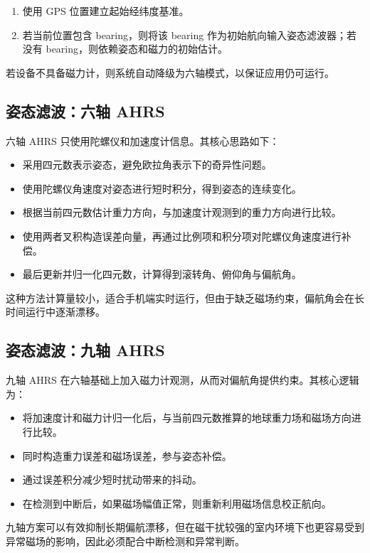\documentclass[12pt,a4paper]{ctexart}
\begin{document}
\begin{enumerate}
    \item 使用 GPS 位置建立起始经纬度基准。
    \item 若当前位置包含 bearing，则将该 bearing 作为初始航向输入姿态滤波器；若没有 bearing，则依赖姿态和磁力的初始估计。
\end{enumerate}

若设备不具备磁力计，则系统自动降级为六轴模式，以保证应用仍可运行。

\subsection{姿态滤波：六轴 AHRS}
六轴 AHRS 只使用陀螺仪和加速度计信息。其核心思路如下：

\begin{itemize}
    \item 采用四元数表示姿态，避免欧拉角表示下的奇异性问题。
    \item 使用陀螺仪角速度对姿态进行短时积分，得到姿态的连续变化。
    \item 根据当前四元数估计重力方向，与加速度计观测到的重力方向进行比较。
    \item 使用两者叉积构造误差向量，再通过比例项和积分项对陀螺仪角速度进行补偿。
    \item 最后更新并归一化四元数，计算得到滚转角、俯仰角与偏航角。
\end{itemize}

这种方法计算量较小，适合手机端实时运行，但由于缺乏磁场约束，偏航角会在长时间运行中逐渐漂移。

\subsection{姿态滤波：九轴 AHRS}
九轴 AHRS 在六轴基础上加入磁力计观测，从而对偏航角提供约束。其核心逻辑为：

\begin{itemize}
    \item 将加速度计和磁力计归一化后，与当前四元数推算的地球重力场和磁场方向进行比较。
    \item 同时构造重力误差和磁场误差，参与姿态补偿。
    \item 通过误差积分减少短时扰动带来的抖动。
    \item 在检测到中断后，如果磁场幅值正常，则重新利用磁场信息校正航向。
\end{itemize}

九轴方案可以有效抑制长期偏航漂移，但在磁干扰较强的室内环境下也更容易受到异常磁场的影响，因此必须配合中断检测和异常判断。
\end{document}
